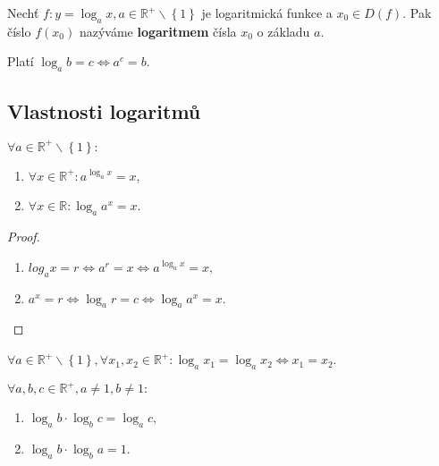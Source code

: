 \begin{definition}
    Nechť $f: y=\log_a x, a \in \mathbb R^+ \smallsetminus \left \{ 1 \right \}$ je
    logaritmická funkce a $x_0\in D(f).$ Pak číslo $f(x_0)$ nazýváme
    \textbf{logaritmem} čísla $x_0$ o základu $a.$
\end{definition}

\begin{pozn}
    Platí $\log_a b=c \iff a^c = b.$
\end{pozn}

\subsection*{Vlastnosti logaritmů}
\begin{veta}
    $\forall a \in \mathbb R^+ \smallsetminus \left \{ 1 \right \}:$
    \begin{enumerate}[$i.$]
        \item $\forall x \in \mathbb R^+: a^{\log_a x}=x$,
       	\item $\forall x \in \mathbb R: \log_a a^x=x$.
    \end{enumerate}
\end{veta}

\begin{proof}
    \,
    \begin{enumerate}[$i.$]
        \item $log_a x = r \iff a^r = x \iff a^{\log_a x}=x,$
       	\item $a^x = r \iff \log_a r=c \iff \log_a a^x = x.$ \qedhere
    \end{enumerate}
\end{proof}

\begin{veta}\label{zakl_reseni}
    $\forall a \in \mathbb R^+ \smallsetminus \left \{ 1 \right \},
    \forall x_1, x_2\in \mathbb R^+: \log_a x_1 = \log_a x_2 \iff x_1 = x_2$.
\end{veta}

\begin{veta}
    $\forall a,b,c\in \mathbb R^+, a\ne 1, b\ne 1:$
    \begin{enumerate}[$i.$]
        \item $\log_a b \cdot \log_b c = \log_a c,$
       	\item $\log_a b \cdot \log_b a = 1.$
    \end{enumerate}
\end{veta}

